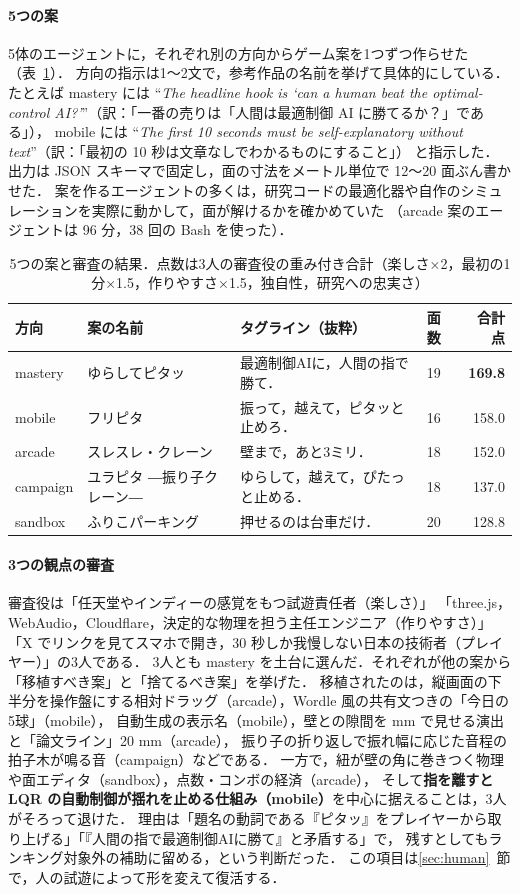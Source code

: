 \documentclass[a4paper,10pt]{ltjsarticle}
\newcommand{\tabref}[1]{表~\ref{#1}}
\newcommand{\secref}[1]{\ref{#1}~節}
\begin{document}
\paragraph{5つの案} 5体のエージェントに，それぞれ別の方向からゲーム案を1つずつ作らせた（\tabref{tab:concepts}）．
方向の指示は1〜2文で，参考作品の名前を挙げて具体的にしている．たとえば mastery には
``\textit{The headline hook is `can a human beat the optimal-control AI?'}''（訳：「一番の売りは「人間は最適制御 AI に勝てるか？」である」），
mobile には ``\textit{The first 10 seconds must be self-explanatory without text}''（訳：「最初の 10 秒は文章なしでわかるものにすること」） と指示した．
出力は JSON スキーマで固定し，面の寸法をメートル単位で 12〜20 面ぶん書かせた．
案を作るエージェントの多くは，研究コードの最適化器や自作のシミュレーションを実際に動かして，面が解けるかを確かめていた
（arcade 案のエージェントは 96 分，38 回の Bash を使った）．

\begin{table}[H]
\centering
\caption{5つの案と審査の結果．点数は3人の審査役の重み付き合計（楽しさ×2，最初の1分×1.5，作りやすさ×1.5，独自性，研究への忠実さ）}
\label{tab:concepts}
\small
\begin{tabular}{llllr}
\toprule
方向 & 案の名前 & タグライン（抜粋） & 面数 & 合計点 \\
\midrule
mastery & ゆらしてピタッ & 最適制御AIに，人間の指で勝て． & 19 & \textbf{169.8} \\
mobile & フリピタ & 振って，越えて，ピタッと止めろ． & 16 & 158.0 \\
arcade & スレスレ・クレーン & 壁まで，あと3ミリ． & 18 & 152.0 \\
campaign & ユラピタ ―振り子クレーン― & ゆらして，越えて，ぴたっと止める． & 18 & 137.0 \\
sandbox & ふりこパーキング & 押せるのは台車だけ． & 20 & 128.8 \\
\bottomrule
\end{tabular}
\end{table}

\paragraph{3つの観点の審査} 審査役は「任天堂やインディーの感覚をもつ試遊責任者（楽しさ）」
「three.js，WebAudio，Cloudflare，決定的な物理を担う主任エンジニア（作りやすさ）」
「X でリンクを見てスマホで開き，30 秒しか我慢しない日本の技術者（プレイヤー）」の3人である．
3人とも mastery を土台に選んだ．それぞれが他の案から「移植すべき案」と「捨てるべき案」を挙げた．
移植されたのは，縦画面の下半分を操作盤にする相対ドラッグ（arcade），Wordle 風の共有文つきの「今日の5球」（mobile），
自動生成の表示名（mobile），壁との隙間を mm で見せる演出と「論文ライン」20 mm（arcade），
振り子の折り返しで振れ幅に応じた音程の拍子木が鳴る音（campaign）などである．
一方で，紐が壁の角に巻きつく物理や面エディタ（sandbox），点数・コンボの経済（arcade），
そして\textbf{指を離すと LQR の自動制御が揺れを止める仕組み（mobile）}を中心に据えることは，3人がそろって退けた．
理由は「題名の動詞である『ピタッ』をプレイヤーから取り上げる」「『人間の指で最適制御AIに勝て』と矛盾する」で，
残すとしてもランキング対象外の補助に留める，という判断だった．
この項目は\secref{sec:human}で，人の試遊によって形を変えて復活する．
\end{document}
